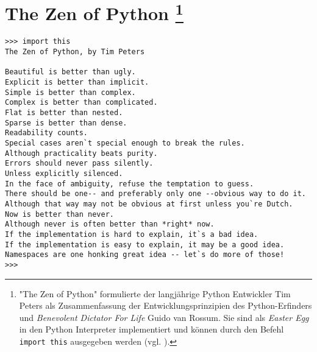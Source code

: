\chapter*{The Zen of Python
\footnote{"The Zen of Python" formulierte der langjährige Python Entwickler Tim Peters als Zusammenfassung der Entwicklungsprinzipien des Python-Erfinders und \emph{Benevolent Dictator For Life} Guido van Rossum. Sie sind als \emph{Easter Egg} in den Python Interpreter implementiert und können durch den Befehl \texttt{import this} ausgegeben werden (vgl. \citep{PEP20}).}
}

\begin{singlespacing}
\lstset{numbers=none, frame=none, breaklines=false}

\begin{lstlisting}
>>> import this
The Zen of Python, by Tim Peters

Beautiful is better than ugly.
Explicit is better than implicit.
Simple is better than complex.
Complex is better than complicated.
Flat is better than nested.
Sparse is better than dense.
Readability counts.
Special cases aren`t special enough to break the rules.
Although practicality beats purity.
Errors should never pass silently.
Unless explicitly silenced.
In the face of ambiguity, refuse the temptation to guess.
There should be one-- and preferably only one --obvious way to do it.
Although that way may not be obvious at first unless you`re Dutch.
Now is better than never.
Although never is often better than *right* now.
If the implementation is hard to explain, it`s a bad idea.
If the implementation is easy to explain, it may be a good idea.
Namespaces are one honking great idea -- let`s do more of those!
>>>
\end{lstlisting}
\end{singlespacing}


